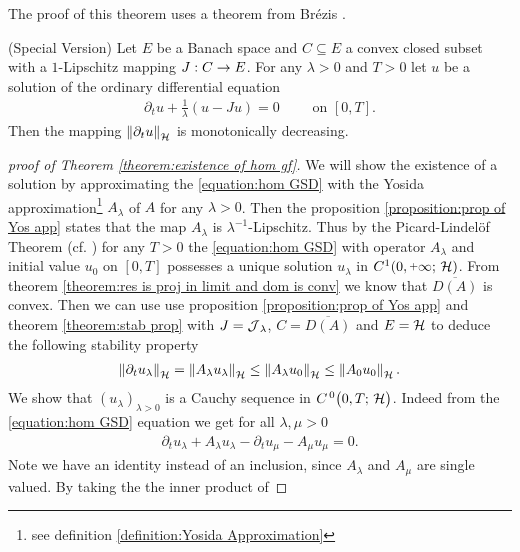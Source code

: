 The proof of this theorem uses a theorem
from Brézis \cite[Theorem 1.6]{brezis1973ope}.

\begin{theorem}\label{theorem:stab prop}
	{\selectfont(Special Version)}
	Let $ E $ be a Banach space and
	$ C\subseteq E $ a convex closed subset with a $ 1 $-Lipschitz
	mapping $ J:C \rightarrow E $. For any $ \lambda>0 $ and $ T>0 $ 
	let $ u $ be a solution of the 
	ordinary differential equation
	\begin{align*}
		\partial_t u+ \frac{1}{\lambda}(u-Ju)=0
		\qquad\text{ on }[0,T].
	\end{align*} 
	Then the mapping $ \left\Vert \partial_t u\right\Vert_{\mathcal{H}} $ 
	is monotonically decreasing.
\end{theorem}

\begin{proof}[proof of Theorem \ref{theorem:existence of hom gf}]
	We will show the existence of a solution by approximating
	the \ref{equation:hom GSD} with the Yosida 
	approximation\footnote{see definition \ref{definition:Yosida Approximation}}
	$ A_\lambda $ of $ A $ for any $ \lambda > 0$. Then the proposition 
	\ref{proposition:prop of Yos app}
	states that the map $ A_\lambda $ is $ \lambda^{-1} $-Lipschitz. 
	Thus by the Picard-Lindelöf Theorem 
	(cf. \cite[Theorem 7.3]{brezis2011functional})
	for any $ T>0 $
	the \ref{equation:hom GSD} with operator $ A_\lambda $
	and initial value $ u_0 $ on $ [0,T] $ possesses a unique 
	solution $ u_\lambda $ in $ C^1(0,\plus\infty;\,\rH) $. From theorem 
	\ref{theorem:res is proj in limit and dom is conv}
	we know that $ \overline{D(A)} $ is convex.
	Then we can use 
	use proposition \ref{proposition:prop of Yos app} and theorem 
	\ref{theorem:stab prop} with $ J=\operatorname{\mathcal{J}}_\lambda $, 
	$ C=\overline{D(A)} $ and $ E=\mathcal{H} $ to deduce the following
	stability property
	\begin{align}\label{eq2:theorem:existence of hom gf}
		\left\Vert \partial_t u_\lambda\right\Vert_{\mathcal{H}}
		=\left\Vert A_\lambda u_\lambda\right\Vert_{\mathcal{H}}
		\leq \left\Vert A_\lambda u_0\right\Vert_{\mathcal{H}}
		\leq \left\Vert A_0 u_0\right\Vert_{\mathcal{H}}.
	\end{align}
	We show that $ (u_\lambda)_{\lambda >0} $ 
	is a Cauchy sequence in $ C^{\, 0}\big(0,T;\,\mathcal{H}\big) $. 
	Indeed from the \ref{equation:hom GSD} equation 
	we get for all $ \lambda,\mu >0 $
	\begin{align}\label{eq1:theorem:existence of hom gf}
		\partial_t u_\lambda+A_\lambda u_\lambda
		-\partial_t u_\mu-A_\mu u_\mu
		=0.
	\end{align}
	Note we have an identity instead of an inclusion, since $ A_\lambda $ and $ A_\mu $ are single valued. By taking the the inner product of 

\end{proof}
